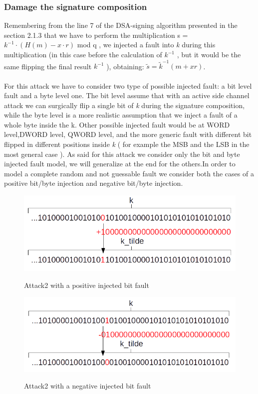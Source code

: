 \documentclass[11pt,english]{article}
\begin{document}
\subsubsection{Damage the signature composition}

Remembering from the line 7 of the DSA-signing algorithm presented in the section 2.1.3 that we have to perform the multiplication s  = $k^{-1} \cdot (H(m) - x \cdot r)$ mod q , we injected a fault into \textit{k} during this multiplication (in this case before the calculation of $k^{-1}$ , but it would be the same flipping the final result $k^{-1}$ ), obtaining: $\tilde{s} = \tilde{k}^{-1}(m + xr)$.
\\\\
For this attack we have to consider two type of possible injected fault: a bit level fault and a byte level one. The bit level assume that with an active side channel attack we can surgically flip a single bit of \textit{k} during the signature composition, while the byte level is a more realistic assumption that we inject a fault of a whole byte inside the k. Other possible injected fault would be at WORD level,DWORD level, QWORD level, and the more generic fault with different bit flipped in different positions inside \textit{k} ( for example the MSB and the LSB in the most general case ). As said for this attack we consider only the bit and byte injected fault model, we will generalize at the end for the others.In order to model a complete random and not guessable fault we consider both the cases of a positive bit/byte injection and negative bit/byte injection.

\begin{figure}[H]
\includegraphics[width=1.0\textwidth]{img/attack2bit.png} \\
\caption{\label{f_etichetta}Attack2 with a positive injected bit fault }
\end{figure}

\begin{figure}[H]
\includegraphics[width=1.0\textwidth]{img/attack2bitneg.png} \\
\caption{\label{f_etichetta}Attack2 with a negative injected bit fault }
\end{figure}
\end{document}
